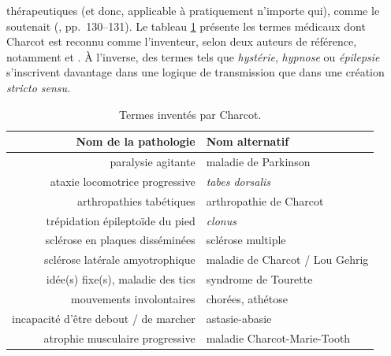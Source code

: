 thérapeutiques (et donc, applicable à pratiquement n'importe qui), comme le soutenait \citeauthor{bernheim1891suggestion} (\citeyear{bernheim1891suggestion}, pp.~130--131). Le tableau \ref{tab:contributions_charcot} présente les termes médicaux dont Charcot est reconnu comme l'inventeur, selon deux auteurs de référence, notamment \citet{walusinski} et \citet{camargo2024}. À l'inverse, des termes tels que \textit{hystérie}, \textit{hypnose} ou \textit{épilepsie} s'inscrivent davantage dans une logique de transmission que dans une création \textit{stricto sensu}.

\begin{table}[h]
	\centering
	\begin{tabular}{rl}
		\textbf{Nom de la pathologie} & \textbf{Nom alternatif} \\
		\hline
		paralysie agitante & maladie de Parkinson\\
		ataxie locomotrice progressive & \textit{tabes dorsalis}\\
		arthropathies tabétiques & arthropathie de Charcot\\
		trépidation épileptoïde du pied & \textit{clonus}\\
		sclérose en plaques disséminées & sclérose multiple\\
		sclérose latérale amyotrophique & maladie de Charcot / Lou Gehrig\\
		idée(s) fixe(s), maladie des tics & syndrome de Tourette\\
		mouvements involontaires & chorées, athétose\\
		incapacité d’être debout / de marcher & astasie-abasie\\
		atrophie musculaire progressive & maladie Charcot-Marie-Tooth\\
		\hline
	\end{tabular}
	\caption{Termes inventés par Charcot.}
	\label{tab:contributions_charcot}
\end{table}
